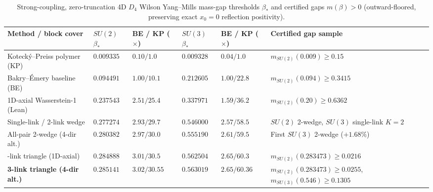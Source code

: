 \begin{table}[tb]
\centering
\caption{Strong-coupling, zero-truncation 4D $D_4$ Wilson Yang--Mills mass-gap thresholds $\beta_*$ and certified gaps
$m(\beta) > 0$ (outward-floored, preserving exact $x_0 = 0$ reflection positivity).}
\label{tab:d4-mass-gaps}
\footnotesize
\begin{tabularx}{\textwidth}{@{}>{\raggedright\arraybackslash}p{3.32cm}>{\centering\arraybackslash}p{1.45cm}>{\centering\arraybackslash}p{1.65cm}>{\centering\arraybackslash}p{1.45cm}>{\centering\arraybackslash}p{1.65cm}>{\raggedright\arraybackslash}X@{}}
\toprule
Method / block cover & $SU(2)$ $\beta_*$ & BE / KP ($\times$) & $SU(3)$ $\beta_*$ & BE / KP ($\times$) & Certified gap sample \\
\midrule
Koteck\'y--Preiss polymer (KP) & $0.009335$ & $0.10 / 1.0$ & $0.009328$ & $0.04 / 1.0$ & $m_{SU(2)}(0.009) \ge 0.15$ \\
Bakry--\'Emery baseline (BE) & $0.094491$ & $1.00 / 10.1$ & $0.212605$ & $1.00 / 22.8$ & $m_{SU(2)}(0.094) \ge 0.3415$ \\
1D-axial Wasserstein-1 (Lean) & $0.237543$ & $2.51 / 25.4$ & $0.337971$ & $1.59 / 36.2$ & $m_{SU(2)}(0.20) \ge 0.6362$ \\
Single-link / 2-link wedge & $0.277274$ & $2.93 / 29.7$ & $0.546000$ & $2.57 / 58.5$ & $SU(2)$ 2-wedge, $SU(3)$ single-link $K{=}2$ \\
All-pair 2-wedge (4-dir alt.) & $0.280382$ & $2.97 / 30.0$ & $0.555190$ & $2.61 / 59.5$ & First $SU(3)$ 2-wedge ($+1.68\%$) \\
3-link triangle (1D-axial) & $0.284888$ & $3.01 / 30.5$ & $0.562504$ & $2.65 / 60.3$ & $m_{SU(2)}(0.283473) \ge 0.0216$ \\
\textbf{3-link triangle (4-dir alt.)} & $\mathbf{0.285141}$ & $\mathbf{3.02 / 30.55}$ & $\mathbf{0.563019}$ & $\mathbf{2.65 / 60.36}$ & $m_{SU(2)}(0.283473) \ge 0.0255$, $m_{SU(3)}(0.546) \ge 0.1305$ \\
\bottomrule
\end{tabularx}
\end{table}
